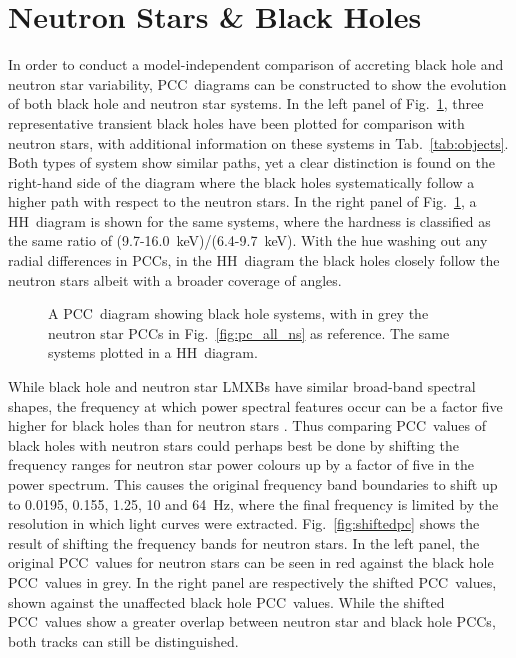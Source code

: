 \section{Neutron Stars \& Black Holes}
In order to conduct a model-independent comparison of accreting black hole and neutron star variability, \ac{PCC}~diagrams can be constructed to show the evolution of both black hole and neutron star systems. In the left panel of Fig.~\ref{fig:ns_bh}, three representative transient black holes have been plotted for comparison with neutron stars, with additional information on these systems in Tab.~\ref{tab:objects}. Both types of system show similar paths, yet a clear distinction is found on the right-hand side of the diagram where the black holes systematically follow a higher path with respect to the neutron stars. In the right panel of Fig.~\ref{fig:ns_bh}, a \ac{HH}~diagram is shown for the same systems, where the hardness is classified as the same ratio of (9.7-16.0~keV)/(6.4-9.7~keV). With the hue washing out any radial differences in \acp{PCC}, in the \ac{HH}~diagram the black holes closely follow the neutron stars albeit with a broader coverage of angles. \\

\begin{figure}[p]
\myfloatalign%
\makebox[\textwidth][r]{%
\subfloat{\texttt{[image: pc/ns\_bh]}}%
\quad%
\subfloat{\texttt{[image: hh/ns\_bh]}}%
}%
\caption[Comparison of neutron stars and black holes]{ A \ac{PCC}~diagram showing black hole systems, with in grey the neutron star \acp{PCC} in Fig.~\ref{fig:pc_all_ns} as reference.  The same systems plotted in a \ac{HH}~diagram.}\label{fig:ns_bh}
\end{figure}

While black hole and neutron star \acp{LMXB} have similar broad-band spectral shapes, the frequency at which power spectral features occur can be a factor five higher for black holes than for neutron stars \citep{kleinwolt}. Thus comparing \ac{PCC}~values of black holes with neutron stars could perhaps best be done by shifting the frequency ranges for neutron star power colours up by a factor of five in the power spectrum. This causes the original frequency band boundaries to shift up to 0.0195, 0.155, 1.25, 10 and 64~Hz, where the final frequency is limited by the resolution in which light curves were extracted. Fig.~\ref{fig:shiftedpc} shows the result of shifting the frequency bands for neutron stars. In the left panel, the original \ac{PCC}~values for neutron stars can be seen in red against the black hole \ac{PCC}~values in grey. In the right panel are respectively the shifted \ac{PCC}~values, shown against the unaffected black hole \ac{PCC}~values. While the shifted \ac{PCC}~values show a greater overlap between neutron star and black hole \acp{PCC}, both tracks can still be distinguished.\\


